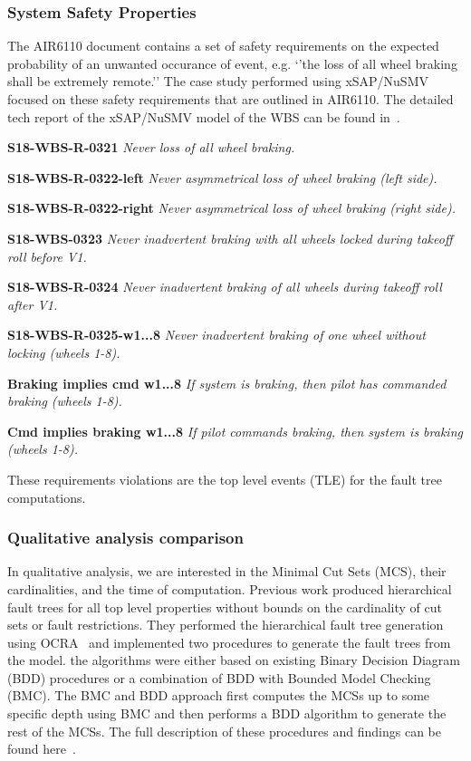 \subsubsection{System Safety Properties}
The AIR6110 document contains a set of safety requirements on the expected probability of an unwanted occurance of event, e.g. `'the loss of all wheel braking shall be extremely remote.'' The case study performed using xSAP/NuSMV~\cite{mattareiThesis, DBLP:conf/cav/BozzanoCPJKPRT15} focused on these safety requirements that are outlined in AIR6110. The detailed tech report of the xSAP/NuSMV model of the WBS can be found in~\cite{air6110TechReport}.

\textbf{S18-WBS-R-0321} \textit{Never loss of all wheel braking.}

\textbf{S18-WBS-R-0322-left} \textit{Never asymmetrical loss of wheel braking (left side).}

\textbf{S18-WBS-R-0322-right} \textit{Never asymmetrical loss of wheel braking (right side).}

\textbf{S18-WBS-0323} \textit{Never inadvertent braking with all wheels locked during takeoff roll before V1.}

\textbf{S18-WBS-R-0324} \textit{Never inadvertent braking of all wheels during takeoff roll after V1.}

\textbf{S18-WBS-R-0325-w1...8} \textit{Never inadvertent braking of one wheel without locking (wheels 1-8).} 

\textbf{Braking implies cmd w1...8} \textit{If system is braking, then pilot has commanded braking (wheels 1-8).} 

\textbf{Cmd implies braking w1...8} \textit{If pilot commands braking, then system is braking (wheels 1-8).} 

These requirements violations are the top level events (TLE) for the fault tree computations. 


\subsubsection{Qualitative analysis comparison}
In qualitative analysis, we are interested in the Minimal Cut Sets (MCS), their cardinalities, and the time of computation. Previous work produced hierarchical fault trees for all top level properties without bounds on the cardinality of cut sets or fault restrictions. They performed the hierarchical fault tree generation using OCRA~\cite{6693137} and implemented two procedures to generate the fault trees from the model. the algorithms were either based on existing Binary Decision Diagram (BDD) procedures or a combination of BDD with Bounded Model Checking (BMC). The BMC and BDD approach first computes the MCSs up to some specific depth using BMC and then performs a BDD algorithm to generate the rest of the MCSs. The full description of these procedures and findings can be found here~\cite{10.1007/978-3-319-11936-6-7, mattareiThesis}. 

